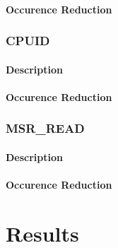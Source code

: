 \documentclass[MMR,Master,english]{twbook}
\begin{document}
\subsubsection{Occurence Reduction}
\clearpage
\subsection{CPUID}
\subsubsection{Description}
\subsubsection{Occurence Reduction}
\clearpage
\subsection{MSR\_READ}
\subsubsection{Description}
\subsubsection{Occurence Reduction}
\clearpage

\chapter{Results}\label{cha:results}

\end{document}
